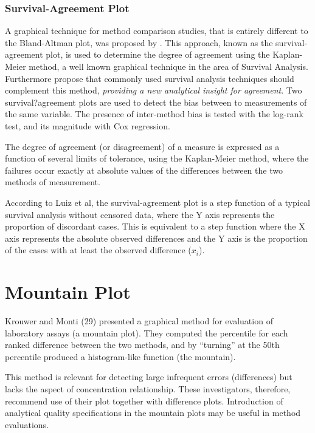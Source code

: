 \documentclass[Main.tex]{subfiles}
\begin{document}
	
\subsubsection{Survival-Agreement Plot}
A graphical technique for method comparison studies, that is entirely different to the Bland-Altman plot, was proposed by \citet{luiz}. This approach, known as the survival-agreement plot, is used to determine the degree of agreement using the Kaplan-Meier method, a well known graphical technique in the area of Survival Analysis. Furthermore \citet{luiz} propose that commonly used survival analysis techniques should complement this method,\textit{ providing a new analytical insight for agreement}. Two survival?agreement plots are used to detect the bias between to measurements of the same variable. The presence of inter-method bias is tested with the log-rank test, and its magnitude with Cox regression.
	
	
The degree of agreement (or disagreement) of a measure is expressed as a function of several limits of tolerance, using the Kaplan-Meier method, where the failures occur exactly at absolute values of the differences between the two methods of measurement. 
	
According to Luiz et al, the survival-agreement plot is a step function of a typical survival analysis without censored data, where the Y axis represents the proportion of discordant cases. This is equivalent to a step function where the X axis represents the absolute  observed differences and the Y axis is the proportion of the cases with at least the observed difference ($x_i$). 
	
	
\section*{Mountain Plot}

Krouwer and Monti (29) presented a graphical method for evaluation of laboratory assays (a mountain plot). 
They computed the percentile for each ranked difference between the two methods, and by “turning” at the 50th percentile 
produced a histogram-like function (the mountain). 

This method is relevant for detecting large infrequent errors (differences) but lacks the aspect of concentration relationship. 
These investigators, therefore, recommend use of their plot together with difference plots. Introduction of analytical quality specifications in the mountain plots may be useful in method evaluations.
\end{document}
